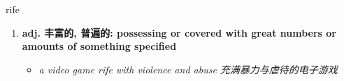 
\begin{frame}
{\huge rife}
\begin{center}
\begin{enumerate}\Large
  \item \textbf{adj. 丰富的, 普遍的: possessing or covered with great numbers or amounts of something specified}
  \begin{itemize}
    \item \em{\Large{a video game rife with violence and abuse 充满暴力与虐待的电子游戏}}
  \end{itemize}
\end{enumerate}
\end{center}
\end{frame}
